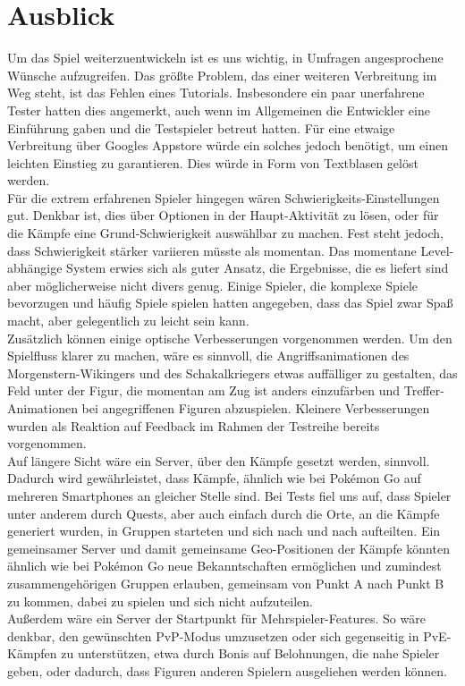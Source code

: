 \documentclass[extern,palatino]{cgBA}
\begin{document}
\section{Ausblick}Um das Spiel weiterzuentwickeln ist es uns wichtig, in Umfragen angesprochene Wünsche aufzugreifen. Das größte Problem, das einer weiteren Verbreitung im Weg steht, ist das Fehlen eines Tutorials. Insbesondere ein paar unerfahrene Tester hatten dies angemerkt, auch wenn im Allgemeinen die Entwickler eine Einführung gaben und die Testspieler betreut hatten. Für eine etwaige Verbreitung über Googles Appstore würde ein solches jedoch benötigt, um einen leichten Einstieg zu garantieren. Dies würde in Form von Textblasen gelöst werden.
\\Für die extrem erfahrenen Spieler hingegen wären Schwierigkeits-Einstellungen gut. Denkbar ist, dies über Optionen in der Haupt-Aktivität zu lösen, oder für die Kämpfe eine Grund-Schwierigkeit auswählbar zu machen. Fest steht jedoch, dass Schwierigkeit stärker variieren müsste als momentan. Das momentane Level-abhängige System erwies sich als guter Ansatz, die Ergebnisse, die es liefert sind aber möglicherweise nicht divers genug. Einige Spieler, die komplexe Spiele bevorzugen und häufig Spiele spielen hatten angegeben, dass das Spiel zwar Spaß macht, aber gelegentlich zu leicht sein kann.
\\Zusätzlich können einige optische Verbesserungen vorgenommen werden. Um den Spielfluss klarer zu machen, wäre es sinnvoll, die Angriffsanimationen des Morgenstern-Wikingers und des Schakalkriegers etwas auffälliger zu gestalten, das Feld unter der Figur, die momentan am Zug ist anders einzufärben und Treffer-Animationen bei angegriffenen Figuren abzuspielen. Kleinere Verbesserungen wurden als Reaktion auf Feedback im Rahmen der Testreihe bereits vorgenommen.
\\Auf längere Sicht wäre ein Server, über den Kämpfe gesetzt werden, sinnvoll. Dadurch wird gewährleistet, dass Kämpfe, ähnlich wie bei Pokémon Go auf mehreren Smartphones an gleicher Stelle sind. Bei Tests fiel uns auf, dass Spieler unter anderem durch Quests, aber auch einfach durch die Orte, an die Kämpfe generiert wurden, in Gruppen starteten und sich nach und nach aufteilten. Ein gemeinsamer Server und damit gemeinsame Geo-Positionen der Kämpfe könnten ähnlich wie bei Pokémon Go neue Bekanntschaften ermöglichen und zumindest zusammengehörigen Gruppen erlauben, gemeinsam von Punkt A nach Punkt B zu kommen, dabei zu spielen und sich nicht aufzuteilen.
\\Außerdem wäre ein Server der Startpunkt für Mehrspieler-Features. So wäre denkbar, den gewünschten PvP-Modus umzusetzen oder sich gegenseitig in PvE-Kämpfen zu unterstützen, etwa durch Bonis auf Belohnungen, die nahe Spieler geben, oder dadurch, dass Figuren anderen Spielern ausgeliehen werden können.
\end{document}
